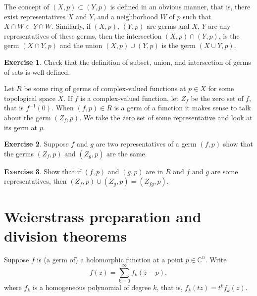\documentclass[12pt,openany]{book}
\newcommand{\C}{{\mathbb{C}}}
\theoremstyle{plain}
\theoremstyle{remark}
\theoremstyle{definition}
\newenvironment{exbox}{%
    \def\FrameCommand{\vrule width 1pt \relax\hspace{10pt}}%
    \MakeFramed {\advance \hsize -\width \FrameRestore}%
}{%
    \endMakeFramed
}
\theoremstyle{exercise}
\newtheorem{exercise}{Exercise}[section]
\theoremstyle{example}
\begin{document}
The concept of $(X,p) \subset (Y,p)$ is defined in an obvious manner,
that is, there exist representatives $X$ and $Y$, and a neighborhood $W$
of $p$ such that $X \cap W \subset Y \cap W$.
Similarly,
if $(X,p)$, $(Y,p)$ are germs and $X$, $Y$
are any representatives of these germs, then
the intersection $(X,p) \cap (Y,p)$,
is the germ $(X \cap Y,p)$ and the union
$(X,p) \cup (Y,p)$ is the germ $(X \cup Y,p)$.

\begin{exbox}
\begin{exercise}
Check that the definition of
subset, union, and intersection of germs
of sets
is well-defined.
\end{exercise}
\end{exbox}


Let $R$ be some ring of germs of complex-valued
functions at $p \in X$ for some topological space $X$.
%
If $f$ is a complex-valued function,
let $Z_f$ be the zero set of $f$, that is $f^{-1}(0)$.
When $(f,p) \in R$ is a germ of a function
it makes sense to talk about the germ $(Z_f,p)$.  We take the zero
set of some representative and look at its germ at $p$.

\begin{exbox}
\begin{exercise}
Suppose $f$ and $g$ are two representatives of a germ $(f,p)$
show that the germs $(Z_f,p)$ and $(Z_g,p)$ are the same.
\end{exercise}

\begin{exercise}
Show that if $(f,p)$ and $(g,p)$ are in $R$
and $f$ and $g$ are some representatives, then
$(Z_f,p) \cup (Z_g,p) = (Z_{fg},p)$.
\end{exercise}
\end{exbox}


\section{Weierstrass preparation and division theorems} \label{sec:wpt}

Suppose
$f$ is (a germ of) a holomorphic function at a point $p \in \C^n$.
Write
\begin{equation*}
f(z) = \sum_{k=0}^\infty f_k(z-p),
\end{equation*}
where $f_k$ is a homogeneous polynomial of degree $k$,
that is, $f_k(tz) = t^k f_k(z)$.
\end{document}
